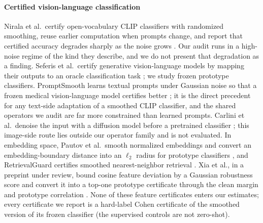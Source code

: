 \paragraph{Certified vision-language classification}
Nirala et al.\ certify open-vocabulary CLIP classifiers with randomized smoothing, reuse earlier computation when prompts change, and report that certified accuracy degrades sharply as the noise grows \cite{nirala2024ovc}. Our audit runs in a high-noise regime of the kind they describe, and we do not present that degradation as a finding. Seferis et al.\ certify generative vision-language models by mapping their outputs to an oracle classification task \cite{seferis2025randomized}; we study frozen prototype classifiers. PromptSmooth learns textual prompts \cite{zhou2022coop} under Gaussian noise so that a frozen medical vision-language model certifies better \cite{hussein2024promptsmooth}; it is the direct precedent for any text-side adaptation of a smoothed CLIP classifier, and the shared operators we audit are far more constrained than learned prompts. Carlini et al.\ denoise the input with a diffusion model before a pretrained classifier \cite{carlini2023dds}; this image-side route lies outside our operator family and is not evaluated. In embedding space, Pautov et al.\ smooth normalized embeddings and convert an embedding-boundary distance into an $\ell_2$ radius for prototype classifiers \cite{pautov2022smoothed}, and RetrievalGuard certifies smoothed nearest-neighbor retrieval \cite{wu2022retrievalguard}. Xia et al., in a preprint under review, bound cosine feature deviation by a Gaussian robustness score and convert it into a top-one prototype certificate through the clean margin and prototype correlation \cite{xia2026feature}. None of these feature certificates enters our estimates; every certificate we report is a hard-label Cohen certificate of the smoothed version of its frozen classifier (the supervised controls are not zero-shot).

